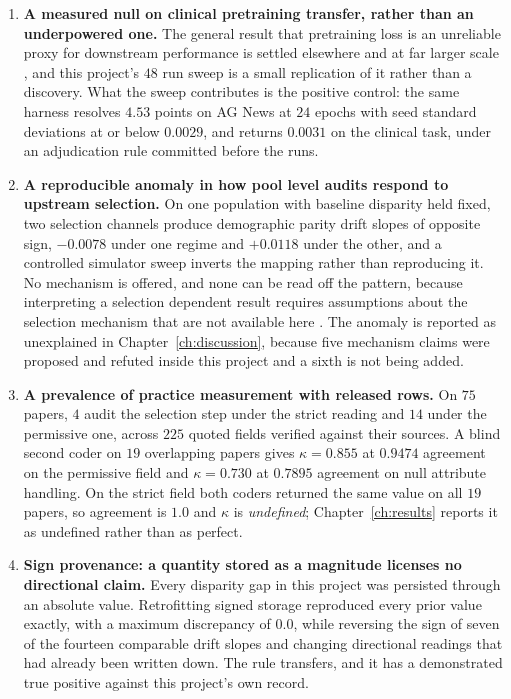 \begin{enumerate}

\item \textbf{A measured null on clinical pretraining transfer, rather than an
underpowered one.} The general result that pretraining loss is an unreliable
proxy for downstream performance is settled elsewhere and at far larger scale
\citep{lourie2025scaling,feng2026tessera}, and this project's $48$
run sweep is a small replication of it rather than a discovery. What the sweep
contributes is the positive control: the same harness resolves $4.53$ points on
AG News at $24$ epochs with seed standard deviations at or below $0.0029$, and
returns $0.0031$ on the clinical task, under an adjudication rule committed
before the runs.

\item \textbf{A reproducible anomaly in how pool level audits respond to
upstream selection.} On one population with baseline disparity held fixed, two
selection channels produce demographic parity drift slopes of opposite sign,
$-0.0078$ under one regime and $+0.0118$ under the other, and a controlled
simulator sweep inverts the mapping rather than reproducing it. No mechanism is
offered, and none can be read off the pattern, because interpreting a
selection dependent result requires assumptions about the selection mechanism
that are not available here \citep{pfohl2025disaggregated,fogliato2020fairness}.
The anomaly is reported as unexplained in Chapter~\ref{ch:discussion},
because five mechanism claims were proposed and refuted inside this project and
a sixth is not being added.

\item \textbf{A prevalence of practice measurement with released rows.} On $75$
papers, $4$ audit the selection step under the strict reading and $14$ under the
permissive one, across $225$ quoted fields verified against their sources. A
blind second coder on $19$ overlapping papers gives $\kappa = 0.855$ at $0.9474$
agreement on the permissive field and $\kappa = 0.730$ at $0.7895$ agreement on
null attribute handling. On the strict field both coders returned the same value
on all $19$ papers, so agreement is $1.0$ and $\kappa$ is \emph{undefined};
Chapter~\ref{ch:results} reports it as undefined rather than as perfect.

\item \textbf{Sign provenance: a quantity stored as a magnitude licenses no
directional claim.} Every disparity gap in this project was persisted through an
absolute value. Retrofitting signed storage reproduced every prior value exactly,
with a maximum discrepancy of $0.0$, while reversing the sign of seven of the
fourteen comparable drift slopes and changing directional readings that had
already been written down. The rule transfers, and it has a demonstrated true
positive against this project's own record.


\end{enumerate}
